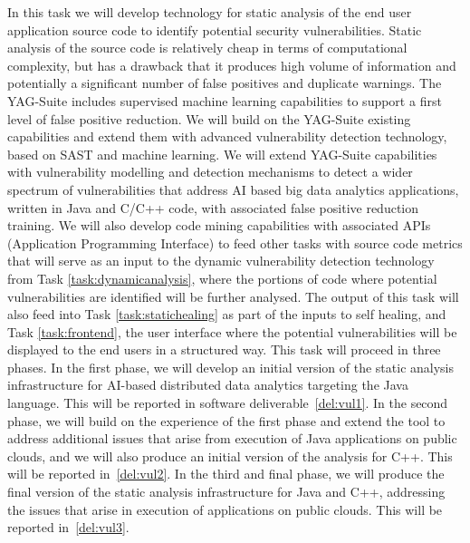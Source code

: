 \begin{Workpackage}{\thewpno}
\begin{Task}
\TaskResults{%
\ref{del:vul1},
\ref{del:vul2},
\ref{del:vul3}
}
\TaskHeader{}
In this task we will develop technology for static analysis of the end user application source code to identify potential security vulnerabilities. Static analysis of the source code is relatively cheap in terms of computational complexity, but has a drawback that it produces high volume of information and potentially a significant number of false positives and duplicate warnings. The YAG-Suite includes supervised machine learning capabilities to support a first level of false positive reduction. We will build on the YAG-Suite existing capabilities and extend them with advanced vulnerability detection technology, based on SAST and machine learning. We will extend YAG-Suite capabilities with vulnerability modelling and detection mechanisms to detect a wider spectrum of vulnerabilities that address AI based big data analytics applications, written in Java and C/C++ code, with associated false positive reduction training. We will also develop code mining capabilities with associated APIs (Application Programming Interface) to feed other tasks with source code metrics that will serve as an input to the dynamic vulnerability detection technology from Task \ref{task:dynamicanalysis}, where the portions of code where potential vulnerabilities are identified will be further analysed. The output of this task will also feed into Task \ref{task:statichealing} as part of the inputs to self healing, and Task \ref{task:frontend}, the user interface where the potential vulnerabilities will be displayed to the end users in a structured way. This task will proceed in three phases. In the first phase, we will develop an initial version of the static analysis infrastructure for AI-based distributed data analytics targeting the Java language. This will be reported in software deliverable~\ref{del:vul1}. In the second phase, we will build on the experience of the first phase and extend the tool to address additional issues that arise from execution of Java applications on public clouds, and we will also produce an initial version of the analysis for C++. This will be reported in~\ref{del:vul2}. In the third and final phase, we will produce the final version of the static analysis infrastructure for Java and C++, addressing the issues that arise in execution of applications on public clouds. This will be reported in~\ref{del:vul3}.


\end{Task}
\end{Workpackage}
